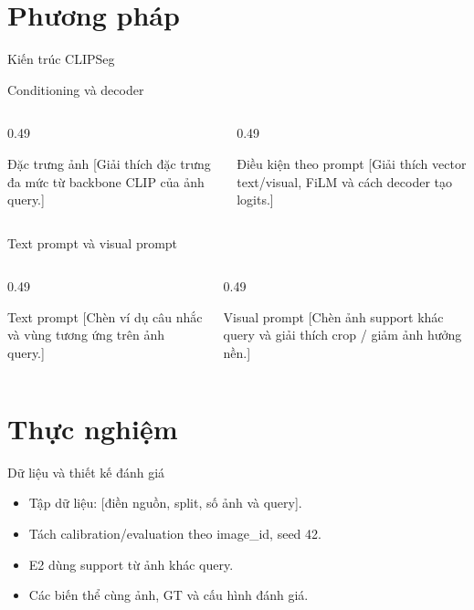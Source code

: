 \section{Phương pháp}
\begin{frame}{Kiến trúc CLIPSeg}
\centering
{}
\end{frame}

\begin{frame}{Conditioning và decoder}
\begin{columns}[T,totalwidth=\textwidth]
\begin{column}{0.49\textwidth}
\begin{block}{Đặc trưng ảnh}
[Giải thích đặc trưng đa mức từ backbone CLIP của ảnh query.]
\end{block}
\end{column}
\begin{column}{0.49\textwidth}
\begin{block}{Điều kiện theo prompt}
[Giải thích vector text/visual, FiLM và cách decoder tạo logits.]
\end{block}
\end{column}
\end{columns}
\end{frame}

\begin{frame}{Text prompt và visual prompt}
\begin{columns}[T,totalwidth=\textwidth]
\begin{column}{0.49\textwidth}
\begin{block}{Text prompt}
[Chèn ví dụ câu nhắc và vùng tương ứng trên ảnh query.]
\end{block}
\end{column}
\begin{column}{0.49\textwidth}
\begin{block}{Visual prompt}
[Chèn ảnh support khác query và giải thích crop / giảm ảnh hưởng nền.]
\end{block}
\end{column}
\end{columns}
\end{frame}

\section{Thực nghiệm}
\begin{frame}{Dữ liệu và thiết kế đánh giá}
\begin{itemize}
\item Tập dữ liệu: [điền nguồn, split, số ảnh và query].
\item Tách calibration/evaluation theo image\_id, seed 42.
\item E2 dùng support từ ảnh khác query.
\item Các biến thể cùng ảnh, GT và cấu hình đánh giá.
\end{itemize}
\end{frame}


